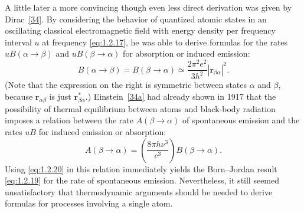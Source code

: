 A little later a more convincing though even less direct derivation was
given by Dirac~\hyperref[ref:1.34]{[34]}. By considering the behavior of quantized atomic states
in an oscillating classical electromagnetic field with energy density per
frequency interval $u$ at frequency \eqref{eq:1.2.17}, he was able to derive formulas
for the rates $uB(\alpha\to\beta)$ and $uB(\beta\to\alpha)$ for absorption or
induced emission:
\begin{equation}
  B(\alpha\to\beta)=B(\beta\to\alpha)
  \simeq\frac{2\pi^2e^2}{3h^2}|\mathbf r_{\beta\alpha}|^2.
  \tag{1.2.20}\label{eq:1.2.20}
\end{equation}
(Note that the expression on the right is symmetric between states $\alpha$
and $\beta$, because $\mathbf r_{\alpha\beta}$ is just
$\mathbf r_{\beta\alpha}^{*}$.) Einstein~\hyperref[ref:1.34a]{[34a]} had already shown in 1917
that the possibility of thermal equilibrium between atoms and black-body
radiation imposes a relation between the rate $A(\beta\to\alpha)$ of spontaneous
emission and the rates $uB$ for induced emission or absorption:
\begin{equation}
  A(\beta\to\alpha)=\left(\frac{8\pi h\nu^3}{c^3}\right)
  B(\beta\to\alpha).
  \tag{1.2.21}\label{eq:1.2.21}
\end{equation}
Using \eqref{eq:1.2.20} in this relation immediately yields the Born--Jordan result
\eqref{eq:1.2.19} for the rate of spontaneous emission. Nevertheless, it still seemed
unsatisfactory that thermodynamic arguments should be needed to derive
formulas for processes involving a single atom.

